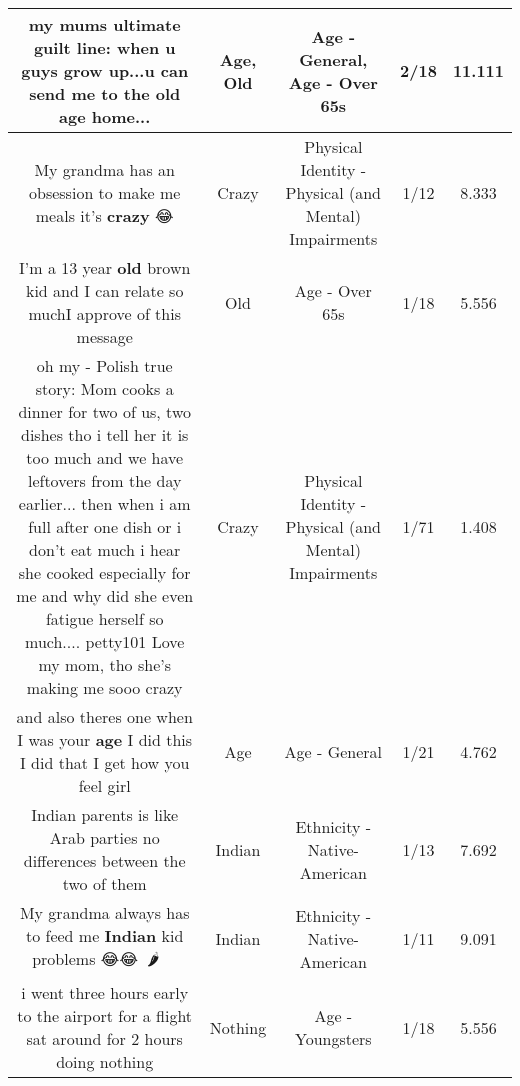 \documentclass[11pt]{article}
\newlength\mylength
\begin{document}
\begin{center}
\begin{longtable}{|C{.65\mylength}|C{.30\mylength}|C{.12\mylength}|C{.12\mylength}|C{.12\mylength}|}
  \small my mums ultimate guilt line:  when u guys grow up...u can send me to the \textbf{old} \textbf{age} home...\normalsize   & Age, Old & Age - General, Age - Over 65s & 2/18 & 11.111 \\  \hline
  \small My grandma has an obsession to make me meals it's \textbf{crazy} 😂\normalsize   & Crazy & Physical Identity - Physical (and Mental) Impairments & 1/12 & 8.333 \\  \hline
  \small I'm a 13 year \textbf{old} brown kid and I can relate so muchI approve of this message\normalsize   & Old & Age - Over 65s & 1/18 & 5.556 \\  \hline
  \small oh my - Polish true story: Mom cooks a dinner for two of us, two dishes tho i tell her it is too much and we have leftovers from the day earlier... then when i am full after one dish  or i don't eat much i hear she cooked especially for me and why did she even fatigue herself so much.... petty101 Love my mom, tho she's making me sooo crazy\normalsize   & Crazy & Physical Identity - Physical (and Mental) Impairments & 1/71 & 1.408 \\  \hline
  \small and also theres one when I was your \textbf{age} I did this I did that I get how you feel girl\normalsize   & Age & Age - General & 1/21 & 4.762 \\  \hline
  \small Indian parents is like Arab parties no differences between the two of them\normalsize   & Indian & Ethnicity - Native-American & 1/13 & 7.692 \\  \hline
  \small My grandma always has to feed me \textbf{Indian} kid problems 😂😂🍗🍕🌶🍅🍓🥗🍲\normalsize   & Indian & Ethnicity - Native-American & 1/11 & 9.091 \\  \hline
  \small i went three hours early to the airport for a flight sat around for 2 hours doing nothing\normalsize   & Nothing & Age - Youngsters & 1/18 & 5.556 \\  \hline

\end{longtable}
\end{center}
\end{document}
